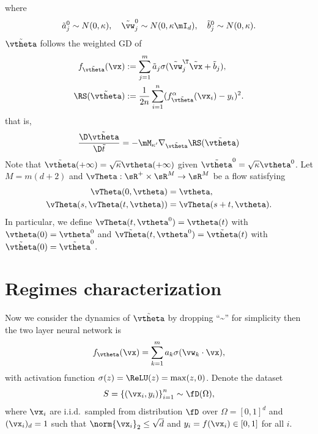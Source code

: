 \documentclass{article}
\begin{document}
where
\begin{equation}
    \tilde{a}^0_j\sim N(0, \kappa), \quad \tilde{\vw}_j^0\sim N(0, \kappa\mI_d), \quad \tilde{b}^0_j\sim N(0, \kappa).
\end{equation}
$\tilde{\vtheta}$ follows the weighted GD of
\begin{align}
    f_{\tilde{\vtheta}}(\vx)
     & := \sum_{j=1}^{m}\tilde{a}_j\sigma(\tilde{\vw}_j^\T\tilde{\vx}+\tilde{b}_j), \\
    \RS(\tilde{\vtheta})
     & :=\frac{1}{2n}\sum_{i=1}^n(f_{\tilde{\vtheta}}^\alpha(\vx_i)-y_i)^2.
\end{align}
that is,
\begin{equation}
    \frac{\D \tilde{\vtheta}}{\D\tilde{t}} = -\mM_{\kappa'}\nabla_{\tilde{\vtheta}}\RS(\tilde{\vtheta})
\end{equation}
Note that $\tilde{\vtheta}(+\infty)=\sqrt{\kappa}\vtheta(+\infty)$ given $\tilde{\vtheta}^0=\sqrt{\kappa}\vtheta^0$. Let $M=m(d+2)$ and $\vTheta:\sR^+\times\sR^M\to\sR^M$ be a flow satisfying
\begin{align}
    \vTheta(0,\vtheta)
     & = \vtheta,              \\
    \vTheta(s,\vTheta(t,\vtheta))
     & = \vTheta(s+t,\vtheta).
\end{align}
In particular, we define $\vTheta(t,\vtheta^0)=\vtheta(t)$ with $\vtheta(0)=\vtheta^0$ and $\tilde{\vTheta}(t,\vtheta^0)=\tilde{\vtheta}(t)$ with $\tilde{\vtheta}(0)=\tilde{\vtheta}^0$.

\section{Regimes characterization}

Now we consider the dynamics of $\tilde{\vtheta}$ by dropping ``\textasciitilde{}'' for simplicity then the two layer neural network is
\begin{equation}
    f_{\vtheta}(\vx) = \sum_{k=1}^{m} a_k\sigma(\vw_k\cdot\vx),
\end{equation}
with activation function $\sigma(z) = \ReLU(z) = \max(z, 0)$. Denote the dataset
\begin{equation}
    S = {\{(\vx_i, y_i)\}}_{i=1}^n \sim \fD(\Omega),
\end{equation}
where $\vx_i$ are i.i.d.\ sampled from distribution $\fD$ over $\Omega={[0,1]}^d$ and $(\vx_i)_d=1$ such that $\norm{\vx_i}_2\leq\sqrt{d}$ and $y_i=f(\vx_i)\in[0,1]$ for all $i$.
\end{document}
